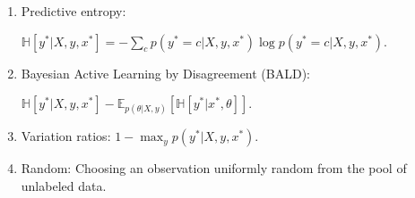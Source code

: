 \begin{enumerate}
  \item Predictive entropy:

  $ \mathbb{H} \left[ y^* | X, y, x^* \right] = - \sum_c p(y^* = c | X, y, x^*) \log p(y^* = c | X, y, x^*)$.

  \item Bayesian Active Learning by Disagreement (BALD):

  $ \mathbb{H} \left[ y^* | X, y, x^* \right] - \mathbb{E}_{p(\theta | X, y)} \left[ \mathbb{H} \left[ y^* | x^*, \theta \right] \right]$.

  \item Variation ratios: $1 - \max_y p(y^* | X, y, x^*)$.

  \item Random: Choosing an observation uniformly random from the pool of unlabeled data.

\end{enumerate}
